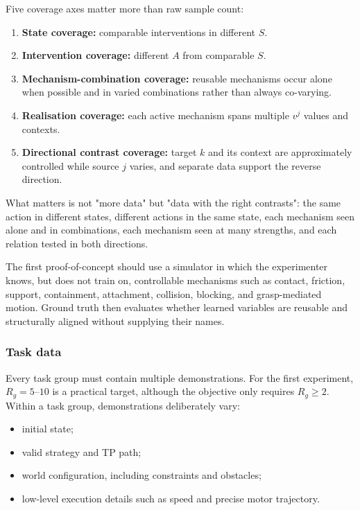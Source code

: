 \documentclass[11pt]{article}
\newenvironment{plainword}{%
  \par\medskip\noindent\begin{minipage}{\textwidth}%
  \color{gray!75!black}\small\itshape
}{%
  \end{minipage}\par\medskip}
\begin{document}
Five coverage axes matter more than raw sample count:

\begin{enumerate}
\item \textbf{State coverage:} comparable interventions in different $S$.
\item \textbf{Intervention coverage:} different $A$ from comparable $S$.
\item \textbf{Mechanism-combination coverage:} reusable mechanisms occur alone when possible and in varied combinations rather than
always co-varying.
\item \textbf{Realisation coverage:} each active mechanism spans multiple $v^j$ values and contexts.
\item \textbf{Directional contrast coverage:} target $k$ and its context are approximately controlled while source $j$ varies, and
separate data support the reverse direction.
\end{enumerate}

\begin{plainword}
What matters is not "more data" but "data with the right contrasts": the same action in different states, different actions in the
same state, each mechanism seen alone and in combinations, each mechanism seen at many strengths, and each relation tested in both
directions.
\end{plainword}

The first proof-of-concept should use a simulator in which the experimenter knows, but does not train on, controllable mechanisms
such as contact, friction, support, containment, attachment, collision, blocking, and grasp-mediated motion. Ground truth then
evaluates whether learned variables are reusable and structurally aligned without supplying their names.

\subsubsection*{Task data}

Every task group must contain multiple demonstrations. For the first experiment, $R_g=5$--$10$ is a practical target, although the
objective only requires $R_g\geq2$. Within a task group, demonstrations deliberately vary:

\begin{itemize}
\item initial state;
\item valid strategy and TP path;
\item world configuration, including constraints and obstacles;
\item low-level execution details such as speed and precise motor trajectory.
\end{itemize}
\end{document}
